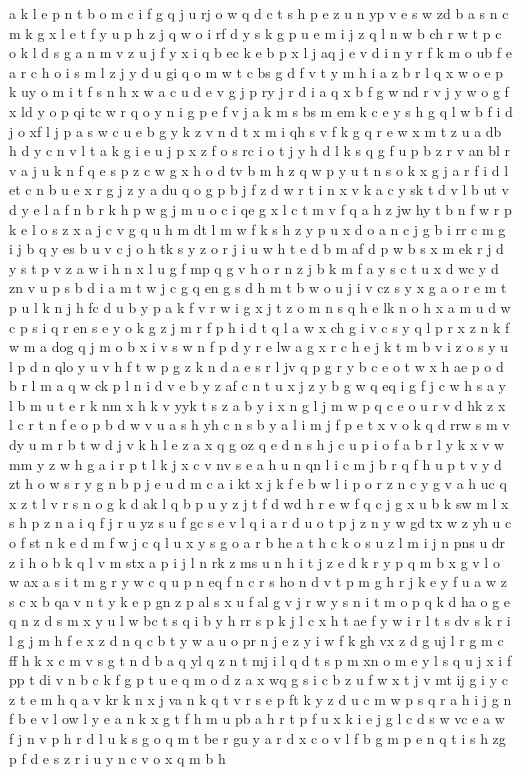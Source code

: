 \documentclass{article}
\begin{document}
a k l e p n t b o m c i f g q j u rj o w q d c t s h p e z u n yp v e s w zd b a s n c m k g x l e t f y u p h z j q w o i rf d y s k g p u e m i j z q l n w b ch r w t p c o k l d s g a n m v z u j f y x i q b ec k e b p x l j aq j e v d i n y r f k m o ub f e a r c h o i s m l z j y d u gi q o m w t c bs g d f v t y m h i a z b r l q x w o e p k uy o m i t f s n h x w a c u d e v g j p ry j r d i a q x b f g w nd r v j y w o g f x ld y o p qi tc w r q o y n i g p e f v j a k m s bs m em k c e y s h g q l w b f i d j o xf l j p a s w c u e b g y k z v n d t x m i qh s v f k g q r e w x m t z u a db h d y c n v l t a k g i e u j p x z f o s rc i o t j y h d l k s q g f u p b z r v an bl r v a j u k n f q e s p z c w g x h o d tv b m h z q w p y u t n s o k x g j a r f i d l et c n b u e x r g j z y a du q o g p b j f z d w r t i n x v k a c y sk t d v l b ut v d y e l a f n b r k h p w g j m u o c i qe g x l c t m v f q a h z jw hy t b n f w r p k e l o s z x a j c v g q u h m dt l m w f k s h z y p u x d o a n c j g b i rr c m g i j b q y es b u v c j o h tk s y z o r j i u w h t e d b m af d p w b s x m ek r j d y s t p v z a w i h n x l u g f mp q g v h o r n z j b k m f a y s c t u x d wc y d zn v u p s b d i a m t w j c g q en g s d h m t b w o u j i v cz s y x g a o r e m t p u l k n j h fc d u b y p a k f v r w i g x j t z o m n s q h e lk n o h x a m u d w c p s i q r en s e y o k g z j m r f p h i d t q l a w x ch g i v c s y q l p r x z n k f w m a dog q j m o b x i v s w n f p d y r e lw a g x r c h e j k t m b v i z o s y u l p d n qlo y u v h f t w p g z k n d a e s r l jv q p g r y b c e o t w x h ae p o d b r l m a q w ck p l n i d v e b y z af c n t u x j z y b g w q eq i g f j c w h s a y l b m u t e r k nm x h k v yyk t s z a b y i x n g l j m w p q c e o u r v d hk z x l c r t n f e o p b d w v u a s h yh c n s b y a l i m j f p e t x v o k q d rrw s m v dy u m r b t w d j v k h l e z a x q g oz q e d n s h j c u p i o f a b r l y k x v w mm y z w h g a i r p t l k j x c v nv s e a h u n qn l i c m j b r q f h u p t v y d zt h o w s r y g n b p j e u d m c a i kt x j k f e b w l i p o r z n c y g v a h uc q x z t l v r s n o g k d ak l q b p u y z j t f d wd h r e w f q c j g x u b k sw m l x s h p z n a i q f j r u yz s u f gc s e v l q i a r d u o t p j z n y w gd tx w z yh u c o f st n k e d m f w j c q l u x y s g o a r b he a t h c k o s u z l m i j n pns u dr z i h o b k q l v m stx a p i j l n rk z ms u n h i t j z e d k r y p q m b x g v l o w ax a s i t m g r y w c q u p n eq f n c r s ho n d v t p m g h r j k e y f u a w z s c x b qa v n t y k e p gn z p al s x u f al g v j r w y s n i t m o p q k d ha o g e q n z d s m x y u l w bc t s q i b y h rr s p k j l c x h t ae f y w i r l t s dv s k r i l g j m h f e x z d n q c b t y w a u o pr n j e z y i w f k gh vx z d g uj l r g m c ff h k x c m v s g t n d b a q yl q z n t mj i l q d t s p m xn o m e y l s q u j x i f pp t di v n b c k f g p t u e q m o d z a x wq g s i c b z u f w x t j v mt ij g i y c z t e m h q a v kr k n x j va n k q t v r s e p ft k y z d u c m w p s q r a h i j g n f b e v l ow l y e a n k x g t f h m u pb a h r t p f u x k i e j g l c d s w vc e a w f j n v p h r d l u k s g o q m t be r gu y a r d x c o v l f b g m p e n q t i s h zg p f d e s z r i u y n c v o x q m b h 
\end{document}
